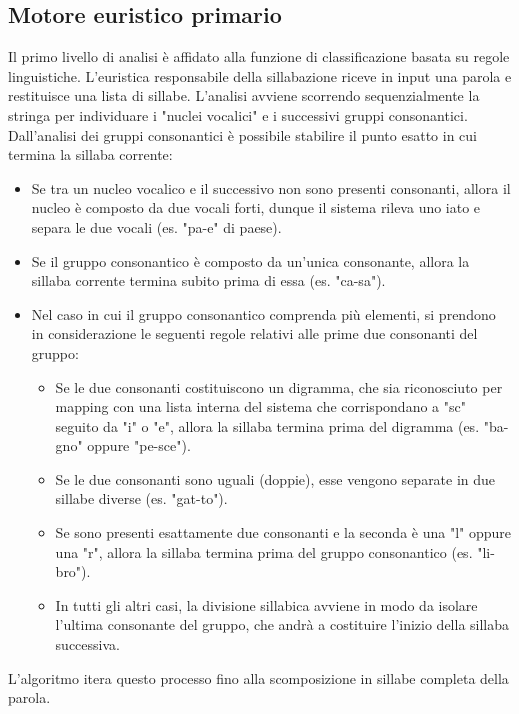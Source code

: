 \subsection{Motore euristico primario}
Il primo livello di analisi è affidato alla funzione di classificazione basata su regole linguistiche. L'euristica responsabile della sillabazione riceve 
in input una parola e restituisce una lista di sillabe. L'analisi avviene scorrendo sequenzialmente la stringa per individuare i "nuclei vocalici" 
e  i successivi gruppi consonantici. Dall'analisi dei gruppi consonantici è possibile stabilire il punto esatto in cui termina la sillaba corrente:
\begin{itemize}
    \item Se tra un nucleo vocalico e il successivo non sono presenti consonanti, allora il nucleo è composto da due vocali forti, 
          dunque il sistema rileva uno iato e separa le due vocali (es. "pa-e" di paese).
    \item Se il gruppo consonantico è composto da un'unica consonante, allora la sillaba corrente termina subito prima di essa (es. "ca-sa").
    \item Nel caso in cui il gruppo consonantico comprenda più elementi, si prendono in considerazione le seguenti regole relativi alle 
          prime due consonanti del gruppo:
	\begin{itemize} 
        \item Se le due consonanti costituiscono un digramma, che sia riconosciuto per mapping con una lista interna del sistema che corrispondano 
              a "sc" seguito da "i" o "e", allora la sillaba termina prima del digramma (es. "ba-gno" oppure "pe-sce").
	    \item Se le due consonanti sono uguali (doppie), esse vengono separate in due sillabe diverse (es. "gat-to").
	    \item Se sono presenti esattamente due consonanti e la seconda è una "l" oppure una "r", allora la sillaba termina prima del gruppo 
              consonantico (es. "li-bro").
	    \item In tutti gli altri casi, la divisione sillabica avviene in modo da isolare l'ultima consonante del gruppo, che andrà a costituire 
              l'inizio della sillaba successiva.
    \end{itemize}
\end{itemize}
L'algoritmo itera questo processo fino alla scomposizione in sillabe completa della parola.


